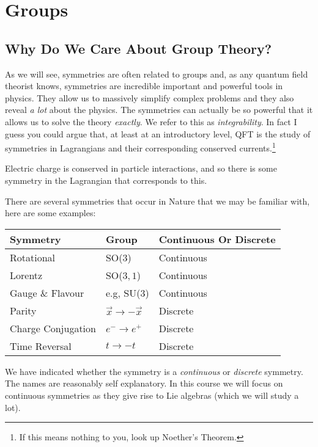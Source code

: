 \chapter{Groups}

\section{Why Do We Care About Group Theory?}

As we will see, symmetries are often related to groups and, as any quantum field theorist knows, symmetries are incredible important and powerful tools in physics. They allow us to massively simplify complex problems and they also reveal \textit{a lot} about the physics. The symmetries can actually be so powerful that it allows us to solve the theory \textit{exactly}. We refer to this as \textit{integrability}. In fact I guess you could argue that, at least at an introductory level, QFT is the study of symmetries in Lagrangians and their corresponding conserved currents.\footnote{If this means nothing to you, look up Noether's Theorem.}

\bex 
    Electric charge is conserved in particle interactions, and so there is some symmetry in the Lagrangian that corresponds to this.  
\eex

There are several symmetries that occur in Nature that we may be familiar with, here are some examples:
\begin{center}
	\begin{tabular}{@{} p{4cm} p{3cm} p{4cm} @{}}
		\toprule
		Symmetry & Group & Continuous Or Discrete \\
		\midrule 
		Rotational & SO($3$) & Continuous \\
		Lorentz & SO($3,1$) & Continuous \\
		Gauge \& Flavour & e.g, SU($3$) & Continuous \\
		Parity & $\vec{x} \longrightarrow -\vec{x}$ & Discrete \\
		Charge Conjugation & $e^- \longrightarrow e^+$ & Discrete \\
		Time Reversal & $ t \longrightarrow -t$ & Discrete \\
		\bottomrule
	\end{tabular}
\end{center}
We have indicated whether the symmetry is a \textit{continuous} or \textit{discrete} symmetry. The names are reasonably self explanatory. In this course we will focus on continuous symmetries as they give rise to Lie algebras (which we will study a lot).

